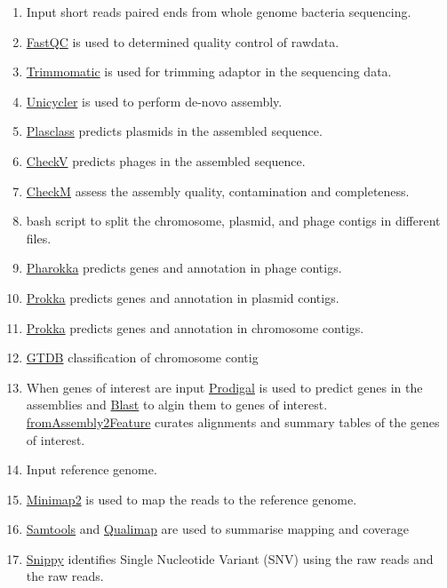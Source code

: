 \documentclass[
]{book}
\providecommand{\tightlist}{%
  \setlength{\itemsep}{0pt}\setlength{\parskip}{0pt}}
\begin{document}
\begin{enumerate}
\def\labelenumi{\arabic{enumi}.}
\tightlist
\item
  Input short reads paired ends from whole genome bacteria sequencing.
\item
  \href{https://www.bioinformatics.babraham.ac.uk/projects/fastqc/}{FastQC} is used to determined quality control of rawdata.
\item
  \href{https://github.com/timflutre/trimmomatic}{Trimmomatic} is used for trimming adaptor in the sequencing data.
\item
  \href{https://github.com/rrwick/Unicycler}{Unicycler} is used to perform de-novo assembly.
\item
  \href{https://github.com/Shamir-Lab/PlasClass}{Plasclass} predicts plasmids in the assembled sequence.
\item
  \href{https://bitbucket.org/berkeleylab/checkv/src/master/}{CheckV} predicts phages in the assembled sequence.
\item
  \href{https://github.com/Ecogenomics/CheckM}{CheckM} assess the assembly quality, contamination and completeness.
\item
  bash script to split the chromosome, plasmid, and phage contigs in different files.
\item
  \href{https://github.com/gbouras13/pharokka}{Pharokka} predicts genes and annotation in phage contigs.
\item
  \href{https://github.com/tseemann/prokka}{Prokka} predicts genes and annotation in plasmid contigs.
\item
  \href{https://github.com/tseemann/prokka}{Prokka} predicts genes and annotation in chromosome contigs.
\item
  \href{https://github.com/Ecogenomics/GTDBTk}{GTDB} classification of chromosome contig
\item
  When genes of interest are input \href{https://github.com/hyattpd/Prodigal}{Prodigal} is used to predict genes in the assemblies and \href{https://blast.ncbi.nlm.nih.gov/Blast.cgi}{Blast} to algin them to genes of interest. \href{https://github.com/LPerlaza/fromAssembly2Feature}{fromAssembly2Feature} curates alignments and summary tables of the genes of interest.
\item
  Input reference genome.
\item
  \href{https://github.com/lh3/minimap2}{Minimap2} is used to map the reads to the reference genome.
\item
  \href{https://github.com/samtools/samtools}{Samtools} and \href{http://qualimap.conesalab.org/}{Qualimap} are used to summarise mapping and coverage
\item
  \href{https://github.com/tseemann/snippy}{Snippy} identifies Single Nucleotide Variant (SNV) using the raw reads and the raw reads.
\end{enumerate}
\end{document}
